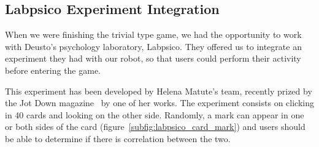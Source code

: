 \subsection{Labpsico Experiment Integration}

When we were finishing the trivial type game, we had the opportunity to work with Deusto's
psychology laboratory, Labpsico. They offered us to integrate an experiment they had with our robot,
so that users could perform their activity before entering the game.

This experiment has been developed by Helena Matute's team, recently prized by the Jot Down
magazine~\cite{jotdown_helena} by one of her works. The experiment consists on clicking in 40 cards
and looking on the other side. Randomly, a mark can appear in one or both sides of the card
(figure~\ref{subfig:labpsico_card_mark}) and users should be able to determine if there is
correlation
between the two.

